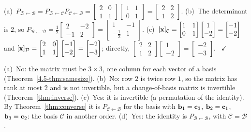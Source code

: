 \documentclass[11pt]{article}
\begin{document}
\begin{description}[leftmargin=0pt,itemsep=5pt]
  \item[Knowledge Check \ref{kc:chain}.] (a)~$P_{\mathcal{D}\leftarrow\mathcal{B}}=P_{\mathcal{D}\leftarrow\mathcal{C}}P_{\mathcal{C}\leftarrow\mathcal{B}}=\begin{bmatrix}2&0\\1&1\end{bmatrix}\begin{bmatrix}1&1\\0&1\end{bmatrix}=\begin{bmatrix}2&2\\1&2\end{bmatrix}$. (b)~The determinant is $2$, so $P_{\mathcal{B}\leftarrow\mathcal{D}}=\tfrac12\begin{bmatrix}2&-2\\-1&2\end{bmatrix}=\begin{bmatrix}1&-1\\-\tfrac12&1\end{bmatrix}$. (c)~$[\mathbf{x}]_{\mathcal{C}}=\begin{bmatrix}1&1\\0&1\end{bmatrix}\begin{bmatrix}1\\-2\end{bmatrix}=\begin{bmatrix}-1\\-2\end{bmatrix}$ and $[\mathbf{x}]_{\mathcal{D}}=\begin{bmatrix}2&0\\1&1\end{bmatrix}\begin{bmatrix}-1\\-2\end{bmatrix}=\begin{bmatrix}-2\\-3\end{bmatrix}$; directly, $\begin{bmatrix}2&2\\1&2\end{bmatrix}\begin{bmatrix}1\\-2\end{bmatrix}=\begin{bmatrix}-2\\-3\end{bmatrix}$. \ $\checkmark$
  \item[Knowledge Check \ref{kc:matrices}.] (a)~No: the matrix must be $3\times3$, one column for each vector of a basis (Theorem~\ref{4.5-thm:samesize}). (b)~No: row $2$ is twice row $1$, so the matrix has rank at most $2$ and is not invertible, but a change-of-basis matrix is invertible (Theorem~\ref{thm:inverse}). (c)~Yes: it is invertible (a permutation of the identity). By Theorem~\ref{thm:converse} it is $P_{\mathcal{C}\leftarrow\mathcal{B}}$ for the basis with $\mathbf{b}_1=\mathbf{c}_3$, $\mathbf{b}_2=\mathbf{c}_1$, $\mathbf{b}_3=\mathbf{c}_2$: the basis $\mathcal{C}$ in another order. (d)~Yes: the identity is $P_{\mathcal{B}\leftarrow\mathcal{B}}$, with $\mathcal{C}=\mathcal{B}$.

\end{description}
\end{document}
